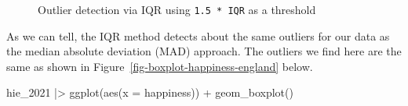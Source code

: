 \documentclass[
  letterpaper,
]{krantz}
\makeatletter
\newenvironment{Shaded}{\begin{snugshade}}{\end{snugshade}}
\newcommand{\AttributeTok}[1]{\textcolor[rgb]{0.40,0.45,0.13}{#1}}
\newcommand{\FunctionTok}[1]{\textcolor[rgb]{0.28,0.35,0.67}{#1}}
\newcommand{\NormalTok}[1]{\textcolor[rgb]{0.00,0.23,0.31}{#1}}
\newcommand{\SpecialCharTok}[1]{\textcolor[rgb]{0.37,0.37,0.37}{#1}}
\newenvironment{kframe}{%
\medskip{}
\setlength{\fboxsep}{.8em}
 \def\at@end@of@kframe{}%
 \ifinner\ifhmode%
  \def\at@end@of@kframe{\end{minipage}}%
  \begin{minipage}{\columnwidth}%
 \fi\fi%
 \def\FrameCommand##1{\hskip\@totalleftmargin \hskip-\fboxsep
 \colorbox{shadecolor}{##1}\hskip-\fboxsep
     \hskip-\linewidth \hskip-\@totalleftmargin \hskip\columnwidth}%
 \MakeFramed {\advance\hsize-\width
   \@totalleftmargin\z@ \linewidth\hsize
   \@setminipage}}%
 {\par\unskip\endMakeFramed%
 \at@end@of@kframe}
\renewenvironment{Shaded}{\begin{kframe}}{\end{kframe}}
\makeatother
\begin{document}
\begin{figure}


\caption{\label{fig-iqr-threshold}Outlier detection via IQR using
\texttt{1.5\ *\ IQR} as a threshold}

\end{figure}%

As we can tell, the IQR method detects about the same outliers for our
data as the median absolute deviation (MAD) approach. The outliers we
find here are the same as shown in
Figure~\ref{fig-boxplot-happiness-england} below.

\begin{Shaded}
\begin{Highlighting}[]
\NormalTok{hie\_2021 }\SpecialCharTok{|\textgreater{}}
  \FunctionTok{ggplot}\NormalTok{(}\FunctionTok{aes}\NormalTok{(}\AttributeTok{x =}\NormalTok{ happiness)) }\SpecialCharTok{+}
  \FunctionTok{geom\_boxplot}\NormalTok{()}
\end{Highlighting}
\end{Shaded}
\end{document}

